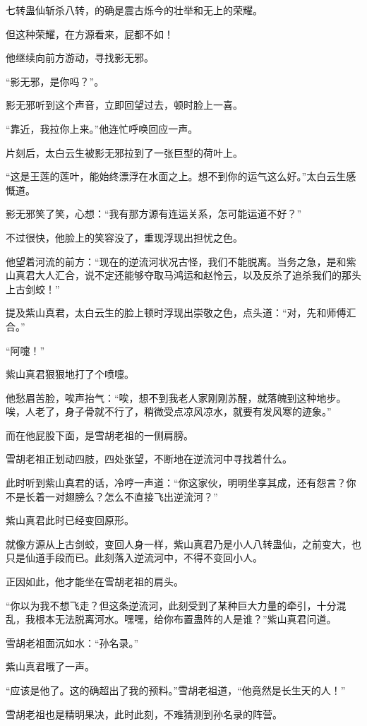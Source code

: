 \begin{this_body}
七转蛊仙斩杀八转，的确是震古烁今的壮举和无上的荣耀。

但这种荣耀，在方源看来，屁都不如！

他继续向前方游动，寻找影无邪。

“影无邪，是你吗？”。

影无邪听到这个声音，立即回望过去，顿时脸上一喜。

“靠近，我拉你上来。”他连忙呼唤回应一声。

片刻后，太白云生被影无邪拉到了一张巨型的荷叶上。

“这是王莲的莲叶，能始终漂浮在水面之上。想不到你的运气这么好。”太白云生感慨道。

影无邪笑了笑，心想：“我有那方源有连运关系，怎可能运道不好？”

不过很快，他脸上的笑容没了，重现浮现出担忧之色。

他望着河流的前方：“现在的逆流河状况古怪，我们不能脱离。当务之急，是和紫山真君大人汇合，说不定还能够夺取马鸿运和赵怜云，以及反杀了追杀我们的那头上古剑蛟！”

提及紫山真君，太白云生的脸上顿时浮现出崇敬之色，点头道：“对，先和师傅汇合。”

“阿嚏！”

紫山真君狠狠地打了个喷嚏。

他愁眉苦脸，唉声抬气：“唉，想不到我老人家刚刚苏醒，就落魄到这种地步。唉，人老了，身子骨就不行了，稍微受点凉风凉水，就要有发风寒的迹象。”

而在他屁股下面，是雪胡老祖的一侧肩膀。

雪胡老祖正划动四肢，四处张望，不断地在逆流河中寻找着什么。

此时听到紫山真君的话，冷哼一声道：“你这家伙，明明坐享其成，还有怨言？你不是长着一对翅膀么？怎么不直接飞出逆流河？”

紫山真君此时已经变回原形。

就像方源从上古剑蛟，变回人身一样，紫山真君乃是小人八转蛊仙，之前变大，也只是仙道手段而已。此刻落入逆流河中，不得不变回小人。

正因如此，他才能坐在雪胡老祖的肩头。

“你以为我不想飞走？但这条逆流河，此刻受到了某种巨大力量的牵引，十分混乱，我根本无法脱离河水。嘿嘿，给你布置蛊阵的人是谁？”紫山真君问道。

雪胡老祖面沉如水：“孙名录。”

紫山真君哦了一声。

“应该是他了。这的确超出了我的预料。”雪胡老祖道，“他竟然是长生天的人！”

雪胡老祖也是精明果决，此时此刻，不难猜测到孙名录的阵营。


\end{this_body}
